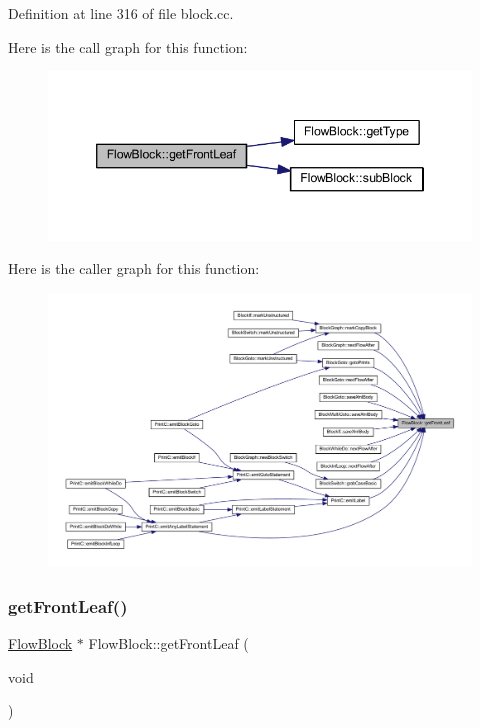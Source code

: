 Definition at line 316 of file block.\+cc.

Here is the call graph for this function\+:
\nopagebreak
\begin{figure}[H]
\begin{center}
\leavevmode
\includegraphics[width=346pt]{class_flow_block_af351e164076032e278a238cbb570710c_cgraph}
\end{center}
\end{figure}
Here is the caller graph for this function\+:
\nopagebreak
\begin{figure}[H]
\begin{center}
\leavevmode
\includegraphics[width=350pt]{class_flow_block_af351e164076032e278a238cbb570710c_icgraph}
\end{center}
\end{figure}
\mbox{\label{class_flow_block_a79329e1df72d004f0b7b8ff475e0143d}} 
\subsubsection{\texorpdfstring{getFrontLeaf()}{getFrontLeaf()}\hspace{0.1cm}{\footnotesize\ttfamily [2/2]}}
{\footnotesize\ttfamily \mbox{\hyperlink{class_flow_block}{Flow\+Block}} $\ast$ Flow\+Block\+::get\+Front\+Leaf (\begin{DoxyParamCaption}\item[{void}]{ }\end{DoxyParamCaption})}



